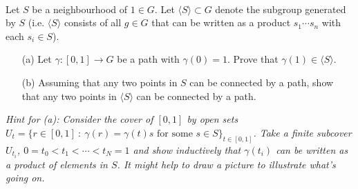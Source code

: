 \documentclass[12pt]{article}
\begin{document}
\begin{question}\ \\
Let $S$ be a neighbourhood of $1\in G$. Let $\langle S\rangle\subset G$ denote the subgroup generated by $S$ (i.e. $\langle S\rangle$ consists of all $g\in G$ that can be written as a product $s_1\cdots s_n$ with each $s_i\in S$).
\begin{enumerate}
\item[(a)] Let $\gamma\colon[0,1]\to G$ be a path with $\gamma(0)=1$. Prove that $\gamma(1)\in\langle S\rangle$.
\item[(b)] Assuming that any two points in $S$ can be connected by a path, show that any two points in $\langle S\rangle$ can be connected by a path.
\end{enumerate}

{\em Hint for (a): Consider the cover of $[0,1]$ by open sets $U_t=\{r\in [0,1]\ :\ \gamma(r)=\gamma(t)s\mbox{ for some }s\in S\}_{t\in[0,1]}$. Take a finite subcover $U_{t_i}$, $0=t_0<t_1<\cdots<t_N=1$ and show inductively that $\gamma(t_i)$ can be written as a product of elements in $S$. It might help to draw a picture to illustrate what's going on.}
\end{question}

\iffalse
\begin{answer}
$G_1\subset\langle S\rangle$: Let $\gamma$ be a path from $1_G$ to $g$. For each $t$ consider the open subset
\[U_t=\{r\in [0,1]\ :\ \gamma(r)=\gamma(t)s\mbox{ for some }s\in S\}=\gamma^{-1}(\gamma(t)S).\]
This gives an open cover of $[0,1]$, which therefore has a finite subcover $U_{t_i}$, $i=0,\ldots,N$ with $0=t_0<t_1<\ldots<t_N=1$. We will prove by induction that $\gamma(t_i)\in \langle S\rangle$ which will then give $\gamma(t_N)=\gamma(1)=g\in \langle S\rangle$ as required.

Certainly $\gamma(t_0)\in S\subset\langle S\rangle$. Suppose $\gamma(t_i)\in\langle S\rangle$. Take $t'\in U_{t_i}\cap U_{t_{i+1}}$. Then:
\begin{itemize}
\item $t'\in U_{t_i}$ implies $\gamma(t')\in\langle S\rangle$ by the induction hypothesis
\item $t'\in U_{t_{i+1}}$ implies $\gamma(t')=\gamma(t_{i+1})s$ for some $s\in S$.
\end{itemize}
Thus $\gamma(t_{i+1})=\gamma(t')s^{-1}\in\langle S\rangle$, which completes the induction proof.

$\langle S\rangle\subset G_1$: Since $g\in \langle S\rangle$ means $g=s_1s_2\cdots s_N$ for some $\{s_i\in S\}_{i=1}^N$. Now each $s_i$ is connected to the identity by a path $\gamma_i$ by assumption. Assume inductively that $\sigma=s_1\cdots s_k$ is connected to the identity by a path. Then this path can be concatenated with $\sigma\gamma_{k+1}$ to get a path connecting $1_G$ to $s_1\cdots s_{k+1}$. Thus $g$ is connected to $1_G$ by a continuous path.
\end{answer}
\fi
\end{document}
